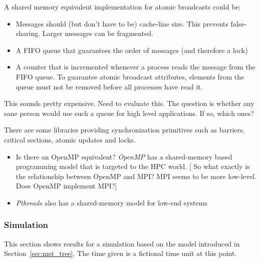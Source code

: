 \documentclass{article}
\newcommand{\stefan}[1]{
  {\color{skRed}[{\color{red}{SK}} #1]}}
\begin{document}
A shared memory equivalent implementation for atomic broadcasts could
be:
\begin{itemize}
\item Messages should (but don't have to be) cache-line size. This
  prevents false-sharing. Larger messages can be fragmented. 
\item A FIFO queue that guarantees the order of messages (and therefore
  a lock)
\item A counter that is incremented whenever a process reads the
  message from the FIFO queue. To guarantee atomic broadcast
  attributes, elements from the queue must not be removed before all
  processes have read it.
\end{itemize}

This sounds pretty expensive. Need to evaluate this. The question is
whether any sane person would use such a queue for high level
applications. If so, which ones?

There are some libraries providing synchronization primitives such as
barriers, critical sections, atomic updates and locks.

\begin{itemize}
\item Is there an OpenMP equivalent? \emph{OpenMP} has a shared-memory
  based programming model that is targeted to the HPC
  world. \stefan{So what exactly is the relationship between OpenMP
    and MPI? MPI seems to be more low-level. Does OpenMP implement
    MPI?}
\item \emph{Pthreads} also has a shared-memory model for low-end
  systems~\cite{OpenMP_paper}
\end{itemize}

\subsubsection{Simulation}

This section shows results for a simulation based on the model
introduced in Section~\ref{sec:mst_tree}. The time given is a
fictional time unit at this point.
\end{document}
